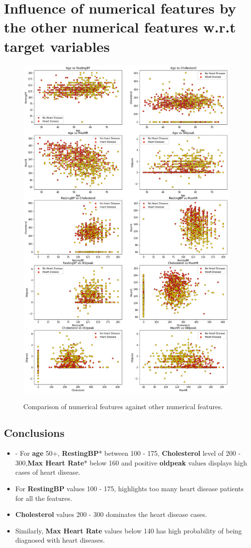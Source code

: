 \section{Influence of numerical features by the other numerical features w.r.t target variables}
\begin{figure}[!htpb]
    \centering
    \includegraphics[width=0.7\linewidth]{Figures/Outputs/numf-numf.png}
    \label{Comparison between numerical features against other numerical features}
    \caption{Comparison of numerical features against other numerical features.}
\end{figure}
\subsection*{Conclusions}
\begin{itemize}
    \item - For \textbf{age} 50+, \textbf{RestingBP}* between 100 - 175, \textbf{Cholesterol} level of 200 - 300,\textbf{Max Heart Rate}* below 160 and positive \textbf{oldpeak} values displays high cases of heart disease.
    \item For \textbf{RestingBP} values 100 - 175, highlights too many heart disease patients for all the features.
    \item \textbf{Cholesterol} values 200 - 300 dominates the heart disease cases.
    \item Similarly, \textbf{Max Heart Rate} values below 140 has high probability of being diagnosed with heart diseases.
\end{itemize}

